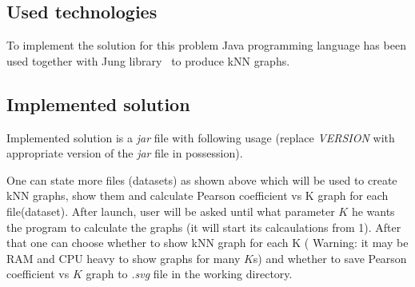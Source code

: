 \subsection{Used technologies}
To implement the solution for this problem Java programming language has been used together with Jung library~\cite{jung} to produce kNN graphs.

\subsection{Implemented solution}
Implemented solution is a \emph{jar} file with following usage (replace \emph{VERSION} with appropriate version of the \emph{jar} file in possession).


One can state more files (datasets) as shown above which will be used to create kNN graphs, show them and calculate Pearson coefficient vs K graph for each file(dataset).
After launch, user will be asked until what parameter $K$ he wants the program to calculate the graphs (it will start its calcaulations from 1).
After that one can choose whether to show kNN graph for each K ( Warning: it may be RAM and CPU heavy to show graphs for many $K$s) and whether to save Pearson coefficient vs $K$ graph to \emph{.svg} file in the working directory.